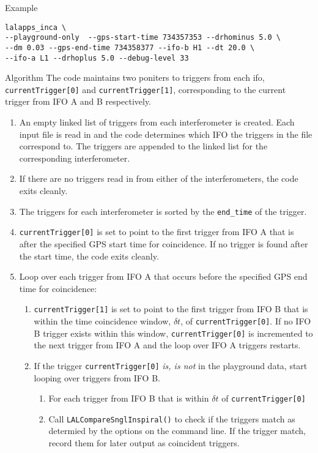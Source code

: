 \begin{entry}
\item[Example]
\begin{verbatim}
lalapps_inca \
--playground-only  --gps-start-time 734357353 --drhominus 5.0 \
--dm 0.03 --gps-end-time 734358377 --ifo-b H1 --dt 20.0 \
--ifo-a L1 --drhoplus 5.0 --debug-level 33
\end{verbatim}

\item[Algorithm]
The code maintains two poniters to triggers from each ifo,
\texttt{currentTrigger[0]} and \texttt{currentTrigger[1]}, corresponding to
the current trigger from IFO A and B respectively.

\begin{enumerate}
\item An empty linked list of triggers from each interferometer is created.
Each input file is read in and the code determines which IFO the triggers in
the file correspond to. The triggers are appended to the linked list for the
corresponding interferometer.

\item If there are no triggers read in from either of the interferometers,
the code exits cleanly.

\item The triggers for each interferometer is sorted by the \texttt{end\_time}
of the trigger.

\item \texttt{currentTrigger[0]} is set to point to the first trigger from IFO
A that is after the specified GPS start time for coincidence. If no trigger is
found after the start time, the code exits cleanly.

\item Loop over each trigger from IFO A that occurs before the specified GPS
end time for coincidence:
\begin{enumerate}
\item \texttt{currentTrigger[1]} is set to point to the first trigger from IFO
B that is within the time coincidence window, $\delta t$, of
\texttt{currentTrigger[0]}. If no IFO B trigger exists within this window,
\texttt{currentTrigger[0]} is incremented to the next trigger from IFO A and
the loop over IFO A triggers restarts.

\item If the trigger \texttt{currentTrigger[0]} \emph{is, is not} in the
playground data, start looping over triggers from IFO B.
\begin{enumerate}
\item For each trigger from IFO B that is within $\delta t$ of
\texttt{currentTrigger[0]}
\item Call \texttt{LALCompareSnglInspiral()} to check if the triggers match as
determied by the options on the command line. If the trigger match, record
them for later output as coincident triggers.
\end{enumerate}


\end{enumerate}
\end{enumerate}
\end{entry}
